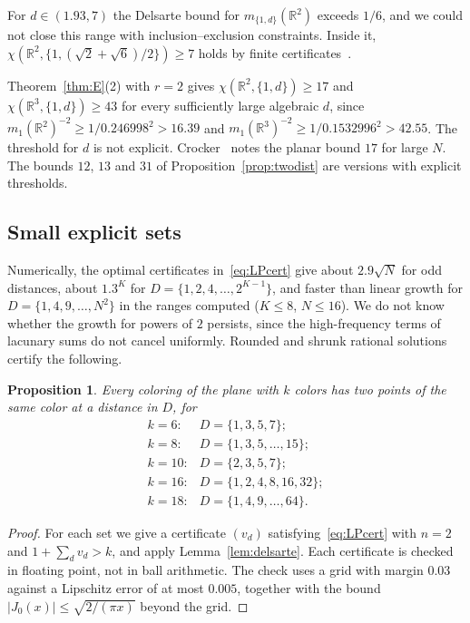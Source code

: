 \documentclass[11pt]{amsart}
\newtheorem{proposition}[theorem]{Proposition}
\theoremstyle{definition}
\newcommand{\R}{\mathbb{R}}
\begin{document}
For $d\in(1.93,7)$ the Delsarte bound for $m_{\{1,d\}}(\R^2)$ exceeds $1/6$, and we could not close this range with inclusion--exclusion constraints. Inside it, $\chi(\R^2,\{1,(\sqrt2+\sqrt6)/2\})\ge7$ holds by finite certificates~\cite{BassRecords}.

Theorem~\ref{thm:E}(2) with $r=2$ gives $\chi(\R^2,\{1,d\})\ge17$ and $\chi(\R^3,\{1,d\})\ge43$ for every sufficiently large algebraic $d$, since $m_1(\R^2)^{-2}\ge1/0.246998^2>16.39$ and $m_1(\R^3)^{-2}\ge1/0.1532996^2>42.55$. The threshold for $d$ is not explicit. Crocker~\cite{Crocker} notes the planar bound $17$ for large $N$. The bounds $12$, $13$ and $31$ of Proposition~\ref{prop:twodist} are versions with explicit thresholds.

\subsection{Small explicit sets}

Numerically, the optimal certificates in~\eqref{eq:LPcert} give about $2.9\sqrt N$ for odd distances, about $1.3^K$ for $D=\{1,2,4,\dots,2^{K-1}\}$, and faster than linear growth for $D=\{1,4,9,\dots,N^2\}$ in the ranges computed ($K\le8$, $N\le16$). We do not know whether the growth for powers of $2$ persists, since the high-frequency terms of lacunary sums do not cancel uniformly. Rounded and shrunk rational solutions certify the following.

\begin{proposition}\label{prop:explicit}
Every coloring of the plane with $k$ colors has two points of the same color at a distance in $D$, for
\[
\begin{array}{ll}
k=6:& D=\{1,3,5,7\};\\
k=8:& D=\{1,3,5,\dots,15\};\\
k=10:& D=\{2,3,5,7\};\\
k=16:& D=\{1,2,4,8,16,32\};\\
k=18:& D=\{1,4,9,\dots,64\}.
\end{array}
\]
\end{proposition}

\begin{proof}
For each set we give a certificate $(v_d)$ satisfying~\eqref{eq:LPcert} with $n=2$ and $1+\sum_dv_d>k$, and apply Lemma~\ref{lem:delsarte}. Each certificate is checked in floating point, not in ball arithmetic. The check uses a grid with margin $0.03$ against a Lipschitz error of at most $0.005$, together with the bound $|J_0(x)|\le\sqrt{2/(\pi x)}$ beyond the grid.
\end{proof}
\end{document}

